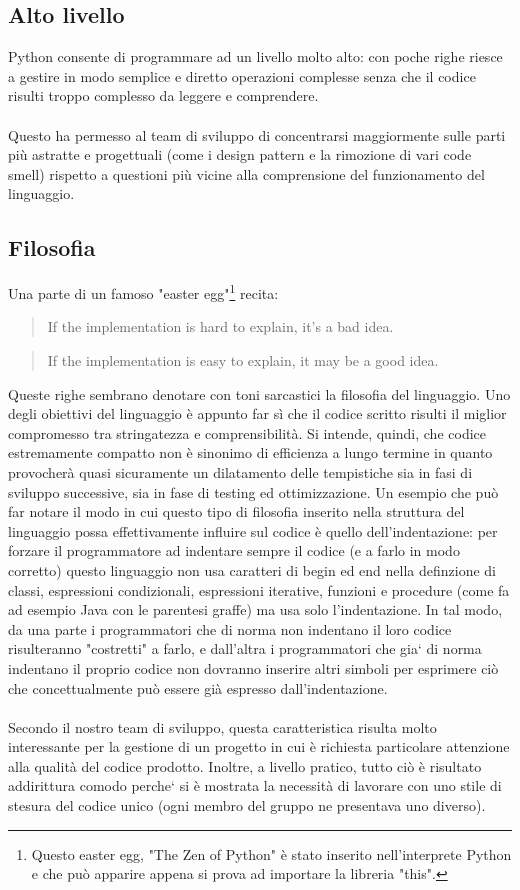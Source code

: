 \documentclass[12pt]{scrartcl}
\begin{document}
\subsection{Alto livello}
Python consente di programmare ad un livello molto alto: con poche righe riesce a gestire
in modo semplice e diretto operazioni complesse senza che il codice risulti troppo complesso da leggere e comprendere.
\\ \\
Questo ha permesso al team di sviluppo di concentrarsi maggiormente sulle parti pi\`u astratte
e progettuali (come i design pattern e la rimozione di vari code smell) rispetto
a questioni pi\`u vicine alla comprensione del funzionamento del linguaggio.
\subsection{Filosofia}
Una parte di un famoso "easter egg"\footnote{Questo easter egg, "The Zen of Python"
\`e stato inserito nell'interprete Python e che pu\`o apparire appena si prova ad 
importare la libreria "this".
}
recita:
\begin{quotation}
If the implementation is hard to explain, it's a bad idea.
\end{quotation}

\begin{quotation}
If the implementation is easy to explain, it may be a good idea.
\end{quotation}
Queste righe sembrano denotare con toni sarcastici la filosofia del linguaggio.
Uno degli obiettivi del linguaggio \`e appunto far s\`i che il codice scritto
risulti il miglior compromesso tra stringatezza e comprensibilit\`a. Si intende,
quindi, che codice estremamente compatto non \`e sinonimo di efficienza a lungo termine
in quanto provocher\`a quasi sicuramente un dilatamento delle tempistiche
sia in fasi di sviluppo successive, sia in fase di testing ed ottimizzazione.
Un esempio che pu\`o far notare il modo in cui questo tipo di filosofia inserito
nella struttura del linguaggio possa effettivamente influire sul codice \`e 
quello dell'indentazione: per forzare il programmatore ad indentare sempre
il codice (e a farlo in modo corretto) questo linguaggio non usa caratteri
di begin ed end nella definzione di classi, espressioni condizionali,
espressioni iterative, funzioni e procedure (come fa ad esempio Java con le
parentesi graffe) ma usa solo l'indentazione. In tal modo, da una parte i programmatori
che di norma non indentano il loro codice risulteranno "costretti" a farlo,
e dall'altra i programmatori che gia` di norma indentano il proprio codice
non dovranno inserire altri simboli per esprimere ci\`o che concettualmente
pu\`o essere gi\`a espresso dall'indentazione. \\ \\
Secondo il nostro team di sviluppo, questa caratteristica risulta molto
interessante per la gestione di un progetto in cui \`e richiesta
particolare attenzione alla qualit\`a del codice prodotto. Inoltre, a livello
pratico, tutto ci\`o \`e risultato addirittura comodo perche` si \`e mostrata la
necessit\`a di lavorare con uno stile di stesura del codice unico (ogni membro
del gruppo ne presentava uno diverso).
\end{document}
